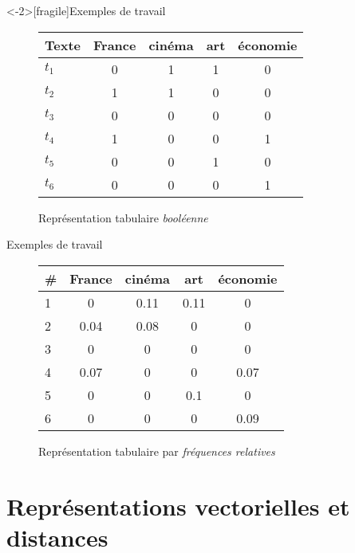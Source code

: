 \documentclass[../allslides.tex]{subfiles}
\begin{document}
\begin{frame}<-2>[fragile]{Exemples de travail}
	\begin{figure}
		\caption{Représentation tabulaire \emph{booléenne}}
		\begin{tabular}{l*{4}{S}}
			\toprule
			\textbf{Texte} & {\textbf{France}} & {\textbf{cinéma}} & {\textbf{art}} & {\textbf{économie}}\\
			\midrule
			\(t_1\) & 0 & 1 & 1 & 0\\
			\(t_2\) & 1 & 1 & 0 & 0\\
			\(t_3\) & 0 & 0 & 0 & 0\\
			\(t_4\) & 1 & 0 & 0 & 1\\
			\(t_5\) & 0 & 0 & 1 & 0\\
			\(t_6\) & 0 & 0 & 0 & 1\\
			\bottomrule
		\end{tabular}
	\end{figure}
\end{frame}

\begin{frame}{Exemples de travail}
	\begin{figure}
		\caption{Représentation tabulaire par \emph{fréquences relatives}}
		\begin{tabular}{l*{4}{S}}
			\toprule
			\# & {\textbf{France}} & {\textbf{cinéma}} & {\textbf{art}} & {\textbf{économie}}\\
			 & 0 & 0.11 & 0.11 & 0\\
			2 & 0.04 & 0.08 & 0 & 0\\
			3 & 0 & 0 & 0 & 0\\
			4 & 0.07 & 0 & 0 & 0.07\\
			5 & 0 & 0 & 0.1 & 0\\
			6 & 0 & 0 & 0 & 0.09\\
			\bottomrule
		\end{tabular}
	\end{figure}
\end{frame}


\section{Représentations vectorielles et distances}
\end{document}
